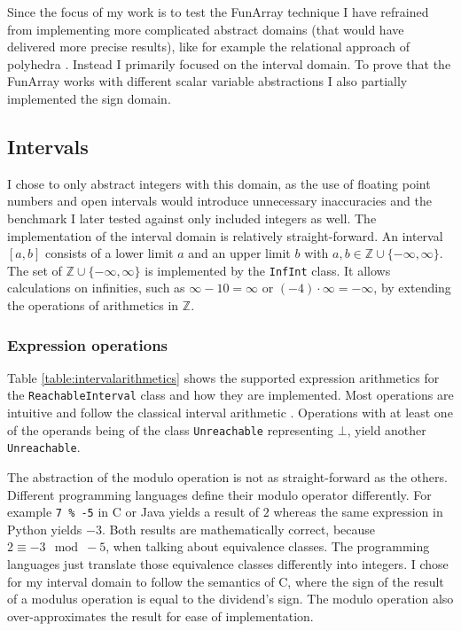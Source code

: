 \documentclass{report}
\begin{document}
Since the focus of my work is to test the FunArray technique I have refrained from implementing more complicated abstract domains (that would have delivered more precise results), like for example the relational approach of polyhedra \cite{cousot1978}. Instead I primarily focused on the interval domain. To prove that the FunArray works with different scalar variable abstractions I also partially implemented the sign domain.

\subsection{Intervals}

I chose to only abstract integers with this domain, as the use of floating point numbers and open intervals would introduce unnecessary inaccuracies and the benchmark I later tested against only included integers as well. The implementation of the interval domain is relatively straight-forward. An interval $[a,b]$ consists of a lower limit $a$ and an upper limit $b$ with $a,b \in \mathbb{Z}\cup\{-\infty,\infty\}$. The set of $\mathbb{Z}\cup\{-\infty,\infty\}$ is implemented by the \texttt{InfInt} class. It allows calculations on infinities, such as $\infty - 10 = \infty$ or $(-4) \cdot \infty = -\infty$, by extending the operations of arithmetics in $\mathbb{Z}$. 


\subsubsection{Expression operations}

Table \ref{table:intervalarithmetics} shows the supported expression arithmetics for the \texttt{ReachableInterval} class and how they are implemented. Most operations are intuitive and follow the classical interval arithmetic \cite{dawood2011}. Operations with at least one of the operands being of the class \texttt{Unreachable} representing $\bot$, yield another \texttt{Unreachable}. 

The abstraction of the modulo operation is not as straight-forward as the others. Different programming languages define their modulo operator differently. For example \texttt{7 \% -5} in C or Java yields a result of $2$ whereas the same expression in Python yields $-3$. Both results are mathematically correct, because $2 \equiv -3 \mod -5$, when talking about equivalence classes. The programming languages just translate those equivalence classes differently into integers. I chose for my interval domain to follow the semantics of C, where the sign of the result of a modulus operation is equal to the dividend's sign. The modulo operation also over-approximates the result for ease of implementation.
\end{document}
